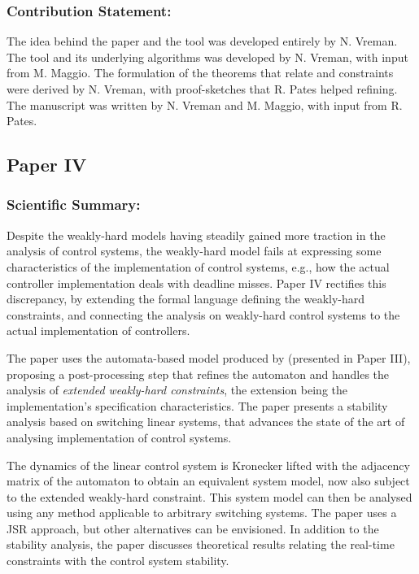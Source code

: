 \subsubsection*{Contribution Statement:}%
%
The idea behind the paper and the tool was developed entirely by N. Vreman. 
The tool and its underlying algorithms was developed by N. Vreman, with input from M. Maggio.
The formulation of the theorems that relate \tAH{} and \tRH{} constraints were derived by N. Vreman, with proof-sketches that R. Pates helped refining.
The manuscript was written by N. Vreman and M. Maggio, with input from R. Pates.


\subsection*{Paper IV}%
%
\begin{quote}
\end{quote}

\subsubsection*{Scientific Summary:}%
%
Despite the weakly-hard models having steadily gained more traction in the analysis of control systems, the weakly-hard model fails at expressing some characteristics of the implementation of control systems, e.g., how the actual controller implementation deals with deadline misses.
Paper IV rectifies this discrepancy, by extending the formal language defining the weakly-hard constraints, and connecting the analysis on weakly-hard control systems to the actual implementation of controllers.

The paper uses the automata-based model produced by \tool{} (presented in Paper III), proposing a post-processing step that refines the automaton and handles the analysis of \emph{extended weakly-hard constraints}, the extension being the implementation's specification characteristics.
The paper presents a stability analysis based on switching linear systems, that advances the state of the art of analysing implementation of control systems.

The dynamics of the linear control system is Kronecker lifted with the adjacency matrix of the automaton to obtain an equivalent system model, now also subject to the extended weakly-hard constraint.
This system model can then be analysed using any method applicable to arbitrary switching systems.
The paper uses a JSR approach, but other alternatives can be envisioned.
In addition to the stability analysis, the paper discusses theoretical results relating the real-time constraints with the control system stability.

